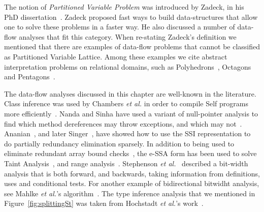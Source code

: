 The notion of {\em Partitioned Variable Problem} was introduced by Zadeck, in his PhD dissertation~\cite{Zadeck84}.
Zadeck proposed fast ways to build data-structures that allow one to solve these problems in a faster way.
He also discussed a number of data-flow analyses that fit this category.
When re-stating Zadeck's definition we mentioned that there are examples of data-flow problems that cannot be classified as Partitioned Variable Lattice.
Among these examples we cite abstract interpretation problems on relational domains, such as Polyhedrons~\cite{Cousot78}, Octagons~\cite{Mine06} and Pentagons~\cite{Logozzo08}.

The data-flow analyses discussed in this chapter are well-known in the literature.
Class inference was used by Chambers {\em et al.} in order to compile Self programs more efficiently~\cite{Chambers89}.
Nanda and Sinha have used a variant of null-pointer analysis to find which method dereferences may throw exceptions, and which may not~\cite{Nanda09}.
Ananian~\cite{Ananian99}, and later Singer~\cite{Singer06}, have showed how to use the SSI representation to do partially redundancy elimination sparsely.
In addition to being used to eliminate redundant array bound checks~\cite{Bodik00}, the e-SSA form has been used to solve Taint Analysis~\cite{Rimsa11}, and range analysis~\cite{Su05,Gawlitza09}.
Stephenson {\em et al.}~\cite{Stephenson00} described a bit-width analysis that is both forward, and backwards, taking information from definitions, uses and conditional tests.
For another example of bidirectional bitwidht analysis, see Mahlke {\em et al.}'s algorithm~\cite{Mahlke01}.
The type inference analysis that we mentioned in Figure~\ref{fig:splittingSt} was taken from Hochstadt {\em et al.}'s work~\cite{Hochstadt08}.